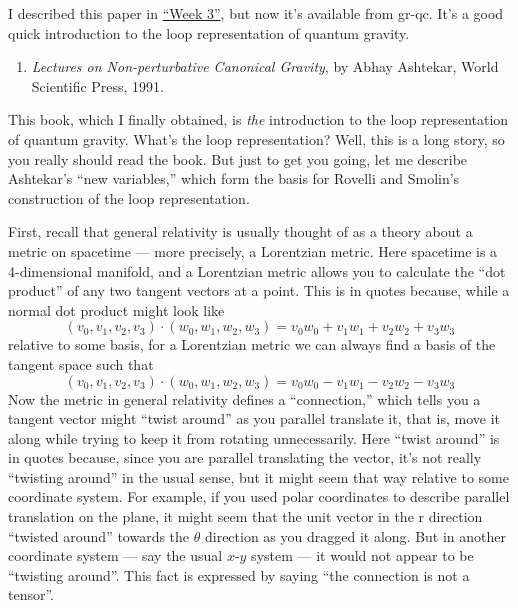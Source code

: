 \documentclass{article}
\def\tightlist{}
\begin{document}
I described this paper in \protect\hyperlink{week3}{``Week 3''}, but now
it's available from gr-qc. It's a good quick introduction to the loop
representation of quantum gravity.

\begin{enumerate}
\def\labelenumi{\arabic{enumi})}
\setcounter{enumi}{1}
\tightlist
\item
  \emph{Lectures on Non-perturbative Canonical Gravity}, by Abhay
  Ashtekar, World Scientific Press, 1991.
\end{enumerate}

This book, which I finally obtained, is \emph{the} introduction to the
loop representation of quantum gravity. What's the loop representation?
Well, this is a long story, so you really should read the book. But just
to get you going, let me describe Ashtekar's ``new variables,'' which
form the basis for Rovelli and Smolin's construction of the loop
representation.

First, recall that general relativity is usually thought of as a theory
about a metric on spacetime --- more precisely, a Lorentzian metric.
Here spacetime is a 4-dimensional manifold, and a Lorentzian metric
allows you to calculate the ``dot product'' of any two tangent vectors
at a point. This is in quotes because, while a normal dot product might
look like
\[(v_0,v_1,v_2,v_3)\cdot(w_0,w_1,w_2,w_3) = v_0w_0 + v_1w_1 + v_2w_2 + v_3w_3\]
relative to some basis, for a Lorentzian metric we can always find a
basis of the tangent space such that
\[(v_0,v_1,v_2,v_3)\cdot(w_0,w_1,w_2,w_3) = v_0w_0 -v_1w_1 -v_2w_2 -v_3w_3\]
Now the metric in general relativity defines a ``connection,'' which
tells you a tangent vector might ``twist around'' as you parallel
translate it, that is, move it along while trying to keep it from
rotating unnecessarily. Here ``twist around'' is in quotes because,
since you are parallel translating the vector, it's not really
``twisting around'' in the usual sense, but it might seem that way
relative to some coordinate system. For example, if you used polar
coordinates to describe parallel translation on the plane, it might seem
that the unit vector in the r direction ``twisted around'' towards the
\(\theta\) direction as you dragged it along. But in another coordinate
system --- say the usual \(x\)-\(y\) system --- it would not appear to
be ``twisting around''. This fact is expressed by saying ``the
connection is not a tensor''.
\end{document}
